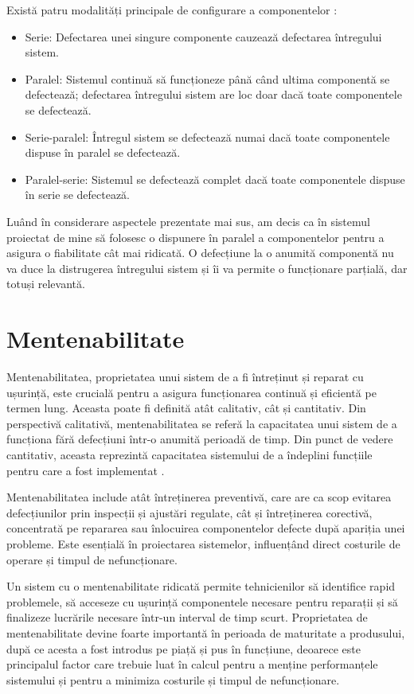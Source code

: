 Există patru modalități principale de configurare a componentelor \cite{fault_tolerant}:

\begin{itemize}
\item Serie: Defectarea unei singure componente cauzează defectarea întregului sistem.
\item Paralel: Sistemul continuă să funcționeze până când ultima componentă se defectează; defectarea întregului sistem are loc doar dacă toate componentele se defectează.
\item Serie-paralel: Întregul sistem se defectează numai dacă toate componentele dispuse în paralel se defectează.
\item Paralel-serie: Sistemul se defectează complet dacă toate componentele dispuse în serie se defectează.
\end{itemize}

Luând în considerare aspectele prezentate mai sus, am decis ca în sistemul proiectat de mine să folosesc o dispunere în paralel a componentelor pentru a asigura o fiabilitate cât mai ridicată. O defecțiune la o anumită componentă nu va duce la distrugerea întregului sistem și îi va permite o funcționare parțială, dar totuși relevantă.


\section{Mentenabilitate}


Mentenabilitatea, proprietatea unui sistem de a fi întreținut și reparat cu ușurință, este crucială pentru a asigura funcționarea continuă și eficientă pe termen lung. Aceasta poate fi definită atât calitativ, cât și cantitativ. Din perspectivă calitativă, mentenabilitatea se referă la capacitatea unui sistem de a funcționa fără defecțiuni într-o anumită perioadă de timp. Din punct de vedere cantitativ, aceasta reprezintă capacitatea sistemului de a îndeplini funcțiile pentru care a fost implementat \cite{fault_tolerant}.

Mentenabilitatea include atât întreținerea preventivă, care are ca scop evitarea defecțiunilor prin inspecții și ajustări regulate, cât și întreținerea corectivă, concentrată pe repararea sau înlocuirea componentelor defecte după apariția unei probleme. Este esențială în proiectarea sistemelor, influențând direct costurile de operare și timpul de nefuncționare.

Un sistem cu o mentenabilitate ridicată permite tehnicienilor să identifice rapid problemele, să acceseze cu ușurință componentele necesare pentru reparații și să finalizeze lucrările necesare într-un interval de timp scurt. Proprietatea de mentenabilitate devine foarte importantă în perioada de maturitate a produsului, după ce acesta a fost introdus pe piață și pus în funcțiune, deoarece este principalul factor care trebuie luat în calcul pentru a menține performanțele sistemului și pentru a minimiza costurile și timpul de nefuncționare.

